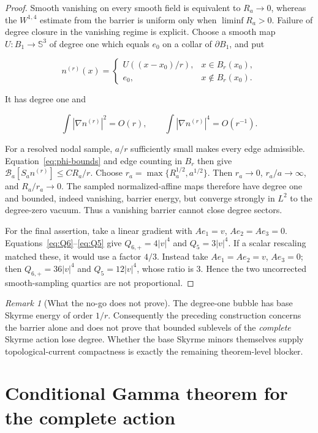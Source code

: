 \documentclass[11pt]{article}
\numberwithin{equation}{section}
\theoremstyle{definition}
\theoremstyle{remark}
\newtheorem{remark}[theorem]{Remark}
\newcommand{\SSS}{\mathbb S}
\newcommand{\cB}{\mathcal B}
\newcommand{\ezer}{e_0}
\begin{document}
\begin{proof}
Smooth vanishing on every smooth field is equivalent to $R_a\to0$, whereas
the $W^{1,4}$ estimate from the barrier is uniform only when
$\liminf R_a>0$.  Failure of degree closure in the vanishing regime is
explicit.  Choose a smooth map
$U:B_1\to\SSS^3$ of degree one which equals $\ezer$ on a collar of
$\partial B_1$, and put

\[
 n^{(r)}(x)=
 \begin{cases}
 U((x-x_0)/r),&x\in B_r(x_0),\\
 \ezer,&x\notin B_r(x_0).
 \end{cases}
\]

It has degree one and

\[
 \int|\nabla n^{(r)}|^2=O(r),\qquad
 \int|\nabla n^{(r)}|^4=O(r^{-1}).
\]

For a resolved nodal sample, $a/r$ sufficiently small makes every edge
admissible.  Equation~\eqref{eq:phi-bounds} and edge counting in $B_r$
then give $\cB_a[S_an^{(r)}]\le C R_a/r$.  Choose
$r_a=\max\{R_a^{1/2},a^{1/2}\}$.  Then $r_a\to0$,
$r_a/a\to\infty$, and $R_a/r_a\to0$.  The sampled normalized-affine maps
therefore have degree one and bounded, indeed vanishing, barrier energy,
but converge strongly in $L^2$ to the degree-zero vacuum.  Thus a vanishing
barrier cannot close degree sectors.

For the final assertion, take a linear gradient with
$Ae_1=v$, $Ae_2=Ae_3=0$.  Equations~\eqref{eq:Q6}--\eqref{eq:Q5} give
$Q_{6,+}=4|v|^4$ and $Q_5=3|v|^4$.  If a scalar rescaling matched these,
it would use a factor $4/3$.  Instead take
$Ae_1=Ae_2=v$, $Ae_3=0$; then $Q_{6,+}=36|v|^4$ and
$Q_5=12|v|^4$, whose ratio is $3$.  Hence the two uncorrected smooth-sampling
quartics are not proportional.
\end{proof}

\begin{remark}[What the no-go does not prove]
The degree-one bubble has base Skyrme energy of order $1/r$.  Consequently
the preceding construction concerns the barrier alone and does not prove
that bounded sublevels of the \emph{complete} Skyrme action lose degree.
Whether the base Skyrme minors themselves supply topological-current
compactness is exactly the remaining theorem-level blocker.
\end{remark}

\section{Conditional Gamma theorem for the complete action}
\end{document}
